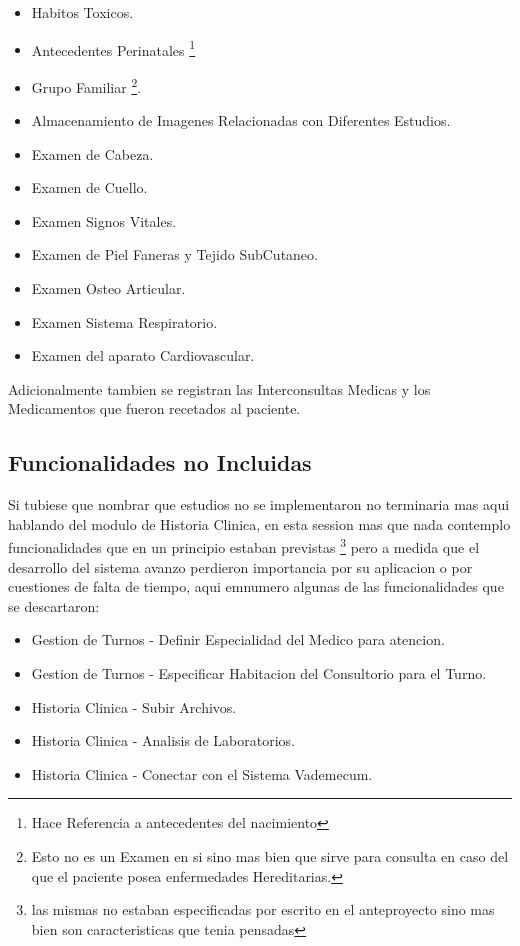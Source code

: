\begin{itemize}
    \item Habitos Toxicos.
    \item Antecedentes Perinatales \footnote{Hace Referencia a antecedentes del nacimiento}
    \item Grupo Familiar \footnote{Esto no es un Examen en si sino mas bien que sirve para 
        consulta en caso del que el paciente posea enfermedades Hereditarias.}.
    \item Almacenamiento de Imagenes Relacionadas con Diferentes Estudios.
    \item Examen de Cabeza.
    \item Examen de Cuello.
    \item Examen Signos Vitales.
    \item Examen de Piel Faneras y Tejido SubCutaneo.
    \item Examen Osteo Articular.
    \item Examen Sistema Respiratorio.
    \item Examen del aparato Cardiovascular.
\end{itemize}

Adicionalmente tambien se registran las Interconsultas Medicas y los Medicamentos
que fueron recetados al paciente.


\subsection{Funcionalidades no Incluidas}

Si tubiese que nombrar que estudios no se implementaron no terminaria mas aqui
hablando del modulo de Historia Clinica, en esta session mas que nada contemplo 
funcionalidades que en un principio estaban previstas \footnote{las mismas no 
estaban especificadas por escrito en el anteproyecto sino mas bien son 
caracteristicas que tenia pensadas} pero a medida que el desarrollo del sistema 
avanzo perdieron importancia por su aplicacion o por cuestiones de falta de 
tiempo, aqui emnumero algunas de las funcionalidades que se descartaron:

\begin{itemize}
    \item Gestion de Turnos - Definir Especialidad del Medico para atencion.
    \item Gestion de Turnos - Especificar Habitacion del Consultorio para el Turno.
    \item Historia Clinica - Subir Archivos.
    \item Historia Clinica - Analisis de Laboratorios.
    \item Historia Clinica - Conectar con el Sistema Vademecum.
\end{itemize}

